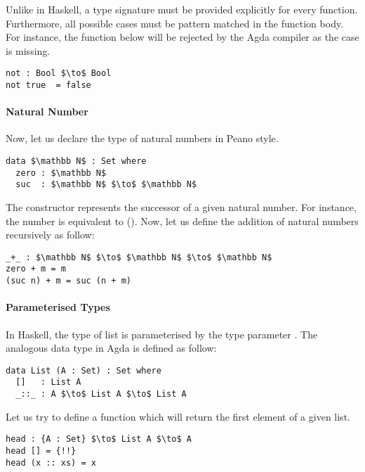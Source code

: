 \par Unlike in Haskell, a type signature must be provided explicitly for every
function. Furthermore, all possible cases must be pattern matched in
the function body. For instance, the function below will be rejected
by the Agda compiler as the case  is missing. 
\begin{lstlisting}[mathescape=true,xleftmargin=.3\textwidth]
not : Bool $\to$ Bool
not true  = false
\end{lstlisting}

\paragraph{Natural Number} Now, let us declare the type of natural
numbers in Peano style. 
\begin{lstlisting}[mathescape=true,xleftmargin=.3\textwidth]
data $\mathbb N$ : Set where
  zero : $\mathbb N$
  suc  : $\mathbb N$ $\to$ $\mathbb N$
\end{lstlisting} 

\par The constructor  represents the successor of a given
natural number. For instance, the number  is equivalent to
(). Now, let us define the addition of natural numbers recursively as follow:
\begin{lstlisting}[mathescape=true,xleftmargin=.3\textwidth]
_+_ : $\mathbb N$ $\to$ $\mathbb N$ $\to$ $\mathbb N$
zero + m = m
(suc n) + m = suc (n + m)
\end{lstlisting} 

\paragraph{Parameterised Types} In Haskell, the type of list \mb{[a]} is parameterised by the type
parameter . The analogous data type in Agda is defined as follow:
\begin{lstlisting}[mathescape=true,xleftmargin=.3\textwidth]
data List (A : Set) : Set where
  []   : List A
  _::_ : A $\to$ List A $\to$ List A
\end{lstlisting} 

\par Let us try to define a function which will return the first
element of a given list. 
\begin{lstlisting}[mathescape=true,xleftmargin=.3\textwidth]
head : {A : Set} $\to$ List A $\to$ A
head [] = {!!}
head (x :: xs) = x
\end{lstlisting} 

